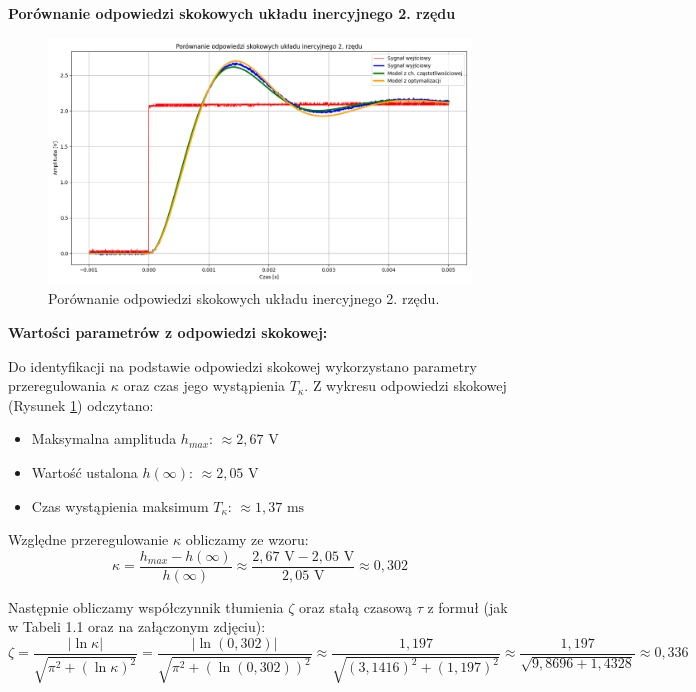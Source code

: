 \documentclass[12pt,a4paper]{article}
\begin{document}
	\textbf{Porównanie odpowiedzi skokowych układu inercyjnego 2. rzędu}
	\begin{figure}[H]
		\centering
		\includegraphics[width=1\linewidth]{zdjecia/ukl2.png}
		\caption{Porównanie odpowiedzi skokowych układu inercyjnego 2. rzędu.}
		\label{fig:OdpSkokowa2}
	\end{figure}
	
	\textbf{Wartości parametrów z odpowiedzi skokowej:}
	
	Do identyfikacji na podstawie odpowiedzi skokowej wykorzystano parametry przeregulowania \(\kappa\) oraz czas jego wystąpienia \(T_{\kappa}\). Z wykresu odpowiedzi skokowej (Rysunek \ref{fig:OdpSkokowa2}) odczytano:
	\begin{itemize}
		\item Maksymalna amplituda \(h_{max}\): $\approx 2,67 \text{ V}$
		\item Wartość ustalona \(h(\infty)\): $\approx 2,05 \text{ V}$
		\item Czas wystąpienia maksimum \(T_{\kappa}\): $\approx 1,37 \text{ ms}$
	\end{itemize}
	
	Względne przeregulowanie \(\kappa\) obliczamy ze wzoru:
	\begin{equation}
		\kappa = \frac{h_{max} - h(\infty)}{h(\infty)}
		\approx \frac{2,67 \text{ V} - 2,05 \text{ V}}{2,05 \text{ V}}
		\approx 0,302
	\end{equation}
	
	Następnie obliczamy współczynnik tłumienia \(\zeta\) oraz stałą czasową \(\tau\) z formuł (jak w Tabeli 1.1 oraz na załączonym zdjęciu):
	\begin{equation}
		\zeta = \frac{|\ln \kappa|}{\sqrt{\pi^2 + (\ln \kappa)^2}}
		= \frac{|\ln (0,302)|}{\sqrt{\pi^2 + (\ln (0,302))^2}}
		\approx \frac{1,197}{\sqrt{(3,1416)^2 + (1,197)^2}}
		\approx \frac{1,197}{\sqrt{9,8696 + 1,4328}}
		\approx 0,336
	\end{equation}
	
\end{document}
